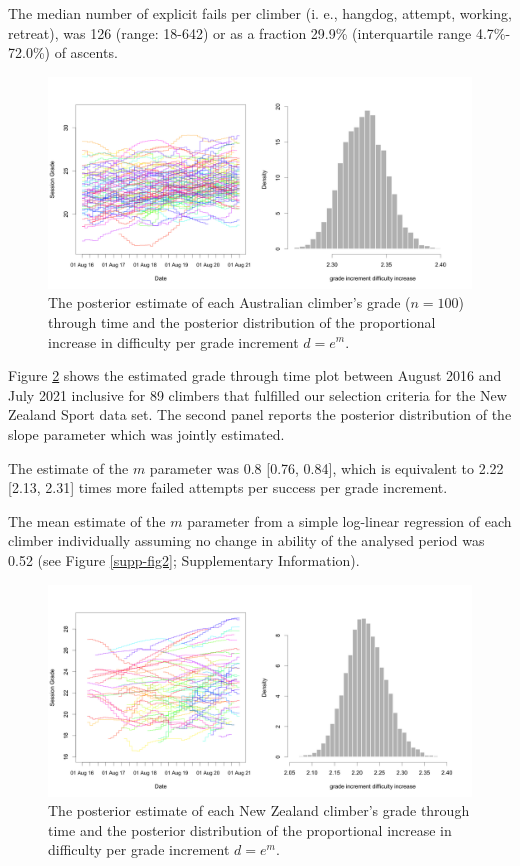 \documentclass{article}
\begin{document}
The median number of explicit fails per climber (i. e., \gls{hangdog}, attempt, working, retreat), was 126 (range: 18-642) or as a fraction 29.9\% (interquartile range 4.7\%- 72.0\%) of ascents.
\begin{figure}
\centering
\includegraphics[width=\textwidth]{../results/aus/ascents-from-2016-08-01-to-2021-08-01-minAscents30-minFails1-Sport-AU-session-posterior.png}
\caption{\small The posterior estimate of each Australian climber's grade ($n=100$) through time and the posterior distribution of the proportional increase in difficulty per grade increment $d = e^m$.}
\label{aus_ascents}
\end{figure}

Figure \ref{nz_ascents} shows the estimated grade through time plot between August 2016 and July 2021 inclusive for 89 climbers that fulfilled our selection criteria for the New Zealand Sport data set. The second panel reports the posterior distribution of the slope parameter which was jointly estimated.

The estimate of the $m$ parameter was 0.8 [0.76, 0.84], which is equivalent to 2.22 [2.13, 2.31] times more failed attempts per success per grade increment. 

The mean estimate of the $m$ parameter from a simple log-linear regression of each climber individually assuming no change in ability of the analysed period was 0.52 (see Figure \ref{supp-fig2}; Supplementary Information). 


\begin{figure}
\centering
\includegraphics[width=\textwidth]{../results/nz/ascents-from-2016-08-01-to-2021-08-01-minAscents30-minFails1-Sport-AU-session-posterior.png}
\caption{\small The posterior estimate of each New Zealand climber's grade through time and the posterior distribution of the proportional increase in difficulty per grade increment $d = e^m$.}
\label{nz_ascents}
\end{figure}
\end{document}
